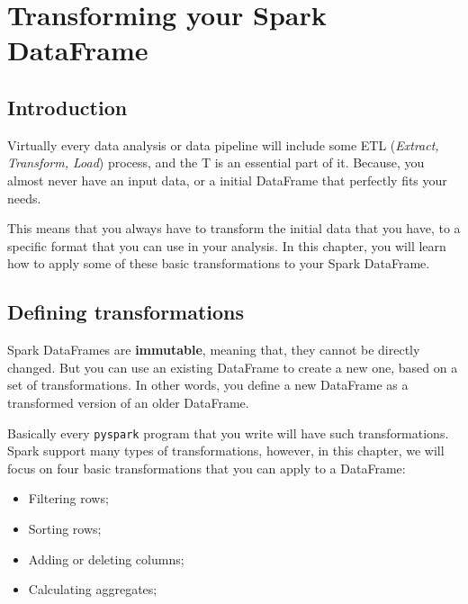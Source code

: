 \documentclass[
  11pt,
  letterpaper,
  DIV=11,
  numbers=noendperiod]{scrreprt}
\providecommand{\tightlist}{%
  \setlength{\itemsep}{0pt}\setlength{\parskip}{0pt}}\usepackage{longtable,booktabs,array}
\begin{document}

\hypertarget{transforming-your-spark-dataframe}{%
\chapter{Transforming your Spark
DataFrame}\label{transforming-your-spark-dataframe}}

\hypertarget{introduction-4}{%
\section{Introduction}\label{introduction-4}}

Virtually every data analysis or data pipeline will include some ETL
(\emph{Extract, Transform, Load}) process, and the T is an essential
part of it. Because, you almost never have an input data, or a initial
DataFrame that perfectly fits your needs.

This means that you always have to transform the initial data that you
have, to a specific format that you can use in your analysis. In this
chapter, you will learn how to apply some of these basic transformations
to your Spark DataFrame.

\hypertarget{sec-df-defining-transformations}{%
\section{Defining
transformations}\label{sec-df-defining-transformations}}

Spark DataFrames are \textbf{immutable}, meaning that, they cannot be
directly changed. But you can use an existing DataFrame to create a new
one, based on a set of transformations. In other words, you define a new
DataFrame as a transformed version of an older DataFrame.

Basically every \texttt{pyspark} program that you write will have such
transformations. Spark support many types of transformations, however,
in this chapter, we will focus on four basic transformations that you
can apply to a DataFrame:

\begin{itemize}
\tightlist
\item
  Filtering rows;
\item
  Sorting rows;
\item
  Adding or deleting columns;
\item
  Calculating aggregates;
\end{itemize}
\end{document}
